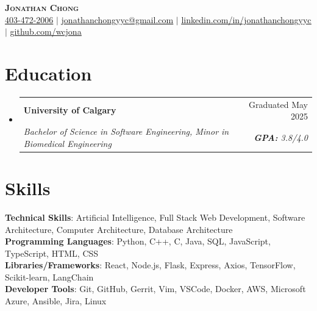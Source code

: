 \documentclass[letterpaper,11pt]{article}
\makeatletter
\newcommand{\resumeSubheading}[4]{
  \vspace{2pt}\item
    \begin{tabular*}{0.97\textwidth}[t]{l@{\extracolsep{\fill}}r}
      \textbf{#1} & #2 \\
      \textit{\small#3} & \textit{\small #4} \\
    \end{tabular*}\vspace{-7pt}
}
\newcommand{\resumeSubHeadingListStart}{\begin{itemize}[leftmargin=0.15in, label={}]}
\newcommand{\resumeSubHeadingListEnd}{\end{itemize}}
\makeatother
\begin{document}
\begin{center}
    \textbf{\Huge \scshape Jonathan Chong} \\ \vspace{3pt}
    \small
    \underline{ 403-472-2006} $|$
    \href{mailto:jonathanchongyyc@gmail.com}{\underline{ jonathanchongyyc@gmail.com}} $|$
    \href{https://linkedin.com/in/jonathanchongyyc}{\underline{ linkedin.com/in/jonathanchongyyc}} $|$
    \href{https://github.com/wcjona}{\underline{ github.com/wcjona}}
\end{center}

\section{Education}
  \resumeSubHeadingListStart
    \resumeSubheading
      {University of Calgary}{Graduated May 2025}
      {Bachelor of Science in Software Engineering, Minor in Biomedical Engineering}{\textbf{GPA:} 3.8/4.0}
  \resumeSubHeadingListEnd

 \section{Skills}
 \vspace{4pt}\begin{itemize}[leftmargin=0.15in, label={}]
    \small{\item{
     \textbf{Technical Skills}{: Artificial Intelligence, Full Stack Web Development, Software Architecture, Computer Architecture, Database Architecture} \\
     \textbf{Programming Languages}{: Python, C++, C, Java, SQL, JavaScript, TypeScript, HTML, CSS} \\
     \textbf{Libraries/Frameworks}{: React, Node.js, Flask, Express, Axios, TensorFlow, Scikit-learn, LangChain} \\
     \textbf{Developer Tools}{: Git, GitHub, Gerrit, Vim, VSCode, Docker, AWS, Microsoft Azure, Ansible, Jira, Linux} \\
    }}
 \end{itemize}

\end{document}
